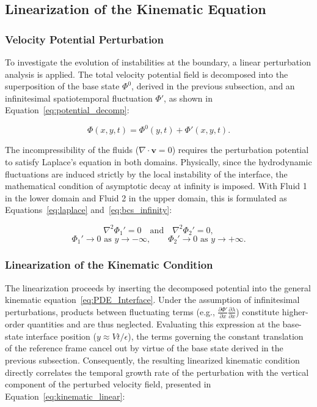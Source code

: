 \subsection{Linearization of the Kinematic Equation}

\subsubsection{Velocity Potential Perturbation}

To investigate the evolution of instabilities at the boundary, a linear perturbation analysis is applied. The total velocity potential field is decomposed into the superposition of the base state $\Phi^0$, derived in the previous subsection, and an infinitesimal spatiotemporal fluctuation $\Phi'$, as shown in Equation~\ref{eq:potential_decomp}:

\begin{equation} \label{eq:potential_decomp}
    \Phi(x,y,t) = \Phi^0(y,t) + \Phi'(x,y,t).
\end{equation}

The incompressibility of the fluids ($\nabla \cdot \mathbf{v} = 0$) requires the perturbation potential to satisfy Laplace's equation in both domains. Physically, since the hydrodynamic fluctuations are induced strictly by the local instability of the interface, the mathematical condition of asymptotic decay at infinity is imposed. With Fluid 1 in the lower domain and Fluid 2 in the upper domain, this is formulated as Equations~\ref{eq:laplace} and~\ref{eq:bcs_infinity}:

\begin{equation} \label{eq:laplace}
    \nabla^2 \Phi_1' = 0 \quad \text{and} \quad \nabla^2 \Phi_2' = 0,
\end{equation}
\begin{equation} \label{eq:bcs_infinity}
    \Phi_1' \to 0 \text{ as } y \to -\infty, \qquad \Phi_2' \to 0 \text{ as } y \to +\infty.
\end{equation}

\subsubsection{Linearization of the Kinematic Condition}

The linearization proceeds by inserting the decomposed potential into the general kinematic equation~\eqref{eq:PDE_Interface}. Under the assumption of infinitesimal perturbations, products between fluctuating terms (e.g., $\frac{\partial \Phi'}{\partial x}\frac{\partial \lambda}{\partial x}$) constitute higher-order quantities and are thus neglected. Evaluating this expression at the base-state interface position ($y \approx Vt/\epsilon$), the terms governing the constant translation of the reference frame cancel out by virtue of the base state derived in the previous subsection. Consequently, the resulting linearized kinematic condition directly correlates the temporal growth rate of the perturbation with the vertical component of the perturbed velocity field, presented in Equation~\ref{eq:kinematic_linear}:

